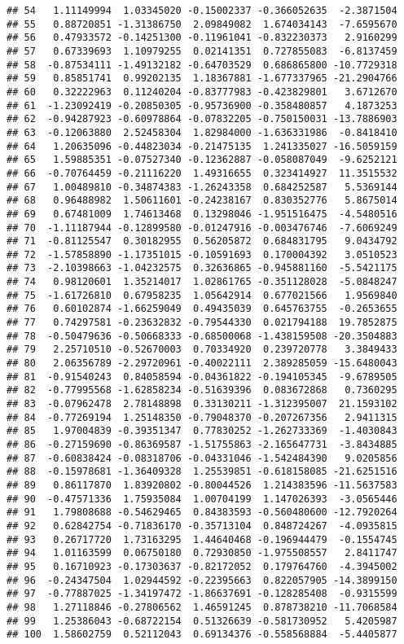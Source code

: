 \documentclass[
]{article}
\begin{document}
\begin{verbatim}
## 54   1.11149994  1.03345020 -0.15002337 -0.366052635  -2.3871504
## 55   0.88720851 -1.31386750  2.09849082  1.674034143  -7.6595670
## 56   0.47933572 -0.14251300 -0.11961041 -0.832230373   2.9160299
## 57   0.67339693  1.10979255  0.02141351  0.727855083  -6.8137459
## 58  -0.87534111 -1.49132182 -0.64703529  0.686865800 -10.7729318
## 59   0.85851741  0.99202135  1.18367881 -1.677337965 -21.2904766
## 60   0.32222963  0.11240204 -0.83777983 -0.423829801   3.6712670
## 61  -1.23092419 -0.20850305 -0.95736900 -0.358480857   4.1873253
## 62  -0.94287923 -0.60978864 -0.07832205 -0.750150031 -13.7886903
## 63  -0.12063880  2.52458304  1.82984000 -1.636331986  -0.8418410
## 64   1.20635096 -0.44823034 -0.21475135  1.241335027 -16.5059159
## 65   1.59885351 -0.07527340 -0.12362887 -0.058087049  -9.6252121
## 66  -0.70764459 -0.21116220  1.49316655  0.323414927  11.3515532
## 67   1.00489810 -0.34874383 -1.26243358  0.684252587   5.5369144
## 68   0.96488982  1.50611601 -0.24238167  0.830352776   5.8675014
## 69   0.67481009  1.74613468  0.13298046 -1.951516475  -4.5480516
## 70  -1.11187944 -0.12899580 -0.01247916 -0.003476746  -7.6069249
## 71  -0.81125547  0.30182955  0.56205872  0.684831795   9.0434792
## 72  -1.57858890 -1.17351015 -0.10591693  0.170004392   3.0510523
## 73  -2.10398663 -1.04232575  0.32636865 -0.945881160  -5.5421175
## 74   0.98120601  1.35214017  1.02861765 -0.351128028  -5.0848247
## 75  -1.61726810  0.67958235  1.05642914  0.677021566   1.9569840
## 76   0.60102874 -1.66259049  0.49435039  0.645763755  -0.2653655
## 77   0.74297581 -0.23632832 -0.79544330  0.021794188  19.7852875
## 78  -0.50479636 -0.50668333 -0.68500068 -1.438159508 -20.3504883
## 79   2.25710510 -0.52670003  0.70334920  0.239720778   3.3849433
## 80   2.06356789 -2.29720961 -0.40022111  2.389285059 -15.6480043
## 81  -0.91540243  0.84058594 -0.04361822 -0.194105345  -9.6789505
## 82  -0.77995568 -1.62858234 -0.51639396  0.083672868   0.7360295
## 83  -0.07962478  2.78148898  0.33130211 -1.312395007  21.1593102
## 84  -0.77269194  1.25148350 -0.79048370 -0.207267356   2.9411315
## 85   1.97004839 -0.39351347  0.77830252 -1.262733369  -1.4030843
## 86  -0.27159690 -0.86369587 -1.51755863 -2.165647731  -3.8434885
## 87  -0.60838424 -0.08318706 -0.04331046 -1.542484390   9.0205856
## 88  -0.15978681 -1.36409328  1.25539851 -0.618158085 -21.6251516
## 89   0.86117870  1.83920802 -0.80044526  1.214383596 -11.5637583
## 90  -0.47571336  1.75935084  1.00704199  1.147026393  -3.0565446
## 91   1.79808688 -0.54629465  0.84383593 -0.560480600 -12.7920264
## 92   0.62842754 -0.71836170 -0.35713104  0.848724267  -4.0935815
## 93   0.26717720  1.73163295  1.44640468 -0.196944479  -0.1554745
## 94   1.01163599  0.06750180  0.72930850 -1.975508557   2.8411747
## 95   0.16710923 -0.17303637 -0.82172052  0.179764760  -4.3945002
## 96  -0.24347504  1.02944592 -0.22395663  0.822057905 -14.3899150
## 97  -0.77887025 -1.34197472 -1.86637691 -0.128285408  -0.9315599
## 98   1.27118846 -0.27806562  1.46591245  0.878738210 -11.7068584
## 99   1.25386043 -0.68722154  0.51326639 -0.581730952   5.4205987
## 100  1.58602759  0.52112043  0.69134376 -0.558568884  -5.4405877
\end{verbatim}
\end{document}
